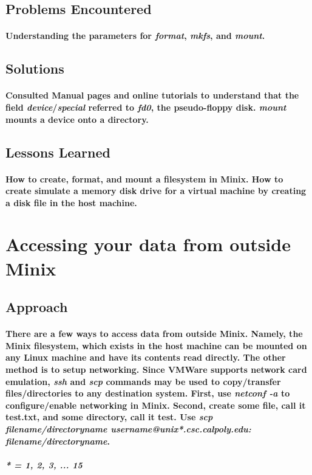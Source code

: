 \documentclass[12pt, oneside, a4paper]{article}
\begin{document}
	\subsection*{Problems Encountered}
		\paragraph{
			Understanding the parameters for \emph{format}, \emph{mkfs}, and
			\emph{mount}.
		}
	\subsection*{Solutions}
		\paragraph{
			Consulted Manual pages and online tutorials to understand that the field
			\emph{device}/\emph{special} referred to \emph{fd0}, the pseudo-floppy disk.
			\emph{mount} mounts a device onto a directory.
		}
	\subsection*{Lessons Learned}
		\paragraph{
			How to create, format, and mount a filesystem in Minix.
			How to create simulate a memory disk drive for a virtual machine by creating
			a disk file in the host machine.
		}
\newpage

\section{Accessing your data from outside Minix}
	\subsection*{Approach}
		\paragraph{
			There are a few ways to access data from outside Minix.  Namely, the Minix
			filesystem, which exists in the host machine can be mounted on any Linux
			machine and have its contents read directly.  The other method is to setup
			networking.  Since VMWare supports network card emulation, \emph{ssh}
			and \emph{scp} commands may be used to copy/transfer files/directories
			to any destination system.  First, use \emph{netconf -a} to configure/enable
			networking in Minix.
			Second, create some file, call it test.txt, and some directory, call it test.
			Use \emph{scp filename/directoryname username@unix*.csc.calpoly.edu:
			filename/directoryname}.
		}
			\subparagraph{
				* = 1, 2, 3, ... 15
			}
\end{document}

